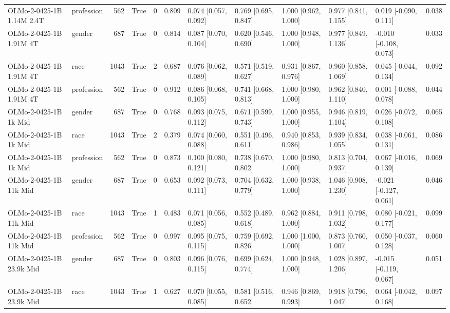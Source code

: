 \begin{tabular}{llrrrrlllllr}
OLMo-2-0425-1B 1.14M 2.4T & profession & 562 & True & 0 & 0.809 & 0.074 [0.057, 0.092] & 0.769 [0.695, 0.847] & 1.000 [0.962, 1.000] & 0.977 [0.841, 1.155] & 0.019 [-0.090, 0.111] & 0.038 \\
OLMo-2-0425-1B 1.91M 4T & gender & 687 & True & 0 & 0.814 & 0.087 [0.070, 0.104] & 0.620 [0.546, 0.690] & 1.000 [0.948, 1.000] & 0.977 [0.849, 1.136] & -0.010 [-0.108, 0.073] & 0.033 \\
OLMo-2-0425-1B 1.91M 4T & race & 1043 & True & 2 & 0.687 & 0.076 [0.062, 0.089] & 0.571 [0.519, 0.627] & 0.931 [0.867, 0.976] & 0.960 [0.858, 1.069] & 0.045 [-0.044, 0.134] & 0.092 \\
OLMo-2-0425-1B 1.91M 4T & profession & 562 & True & 0 & 0.912 & 0.086 [0.068, 0.105] & 0.741 [0.668, 0.813] & 1.000 [0.980, 1.000] & 0.962 [0.840, 1.110] & 0.001 [-0.088, 0.078] & 0.044 \\
OLMo-2-0425-1B 1k Mid & gender & 687 & True & 0 & 0.768 & 0.093 [0.075, 0.112] & 0.671 [0.599, 0.743] & 1.000 [0.955, 1.000] & 0.946 [0.819, 1.104] & 0.026 [-0.072, 0.108] & 0.065 \\
OLMo-2-0425-1B 1k Mid & race & 1043 & True & 2 & 0.379 & 0.074 [0.060, 0.088] & 0.551 [0.496, 0.611] & 0.940 [0.853, 0.986] & 0.939 [0.834, 1.055] & 0.038 [-0.061, 0.131] & 0.086 \\
OLMo-2-0425-1B 1k Mid & profession & 562 & True & 0 & 0.873 & 0.100 [0.080, 0.121] & 0.738 [0.670, 0.802] & 1.000 [0.980, 1.000] & 0.813 [0.704, 0.937] & 0.067 [-0.016, 0.139] & 0.069 \\
OLMo-2-0425-1B 11k Mid & gender & 687 & True & 0 & 0.653 & 0.092 [0.073, 0.111] & 0.704 [0.632, 0.779] & 1.000 [0.938, 1.000] & 1.046 [0.908, 1.230] & -0.021 [-0.127, 0.061] & 0.046 \\
OLMo-2-0425-1B 11k Mid & race & 1043 & True & 1 & 0.483 & 0.071 [0.056, 0.085] & 0.552 [0.489, 0.618] & 0.962 [0.884, 1.000] & 0.911 [0.798, 1.032] & 0.080 [-0.021, 0.177] & 0.099 \\
OLMo-2-0425-1B 11k Mid & profession & 562 & True & 0 & 0.997 & 0.095 [0.075, 0.115] & 0.759 [0.692, 0.826] & 1.000 [1.000, 1.000] & 0.873 [0.760, 1.007] & 0.050 [-0.037, 0.128] & 0.060 \\
OLMo-2-0425-1B 23.9k Mid & gender & 687 & True & 0 & 0.803 & 0.096 [0.076, 0.115] & 0.699 [0.624, 0.774] & 1.000 [0.948, 1.000] & 1.028 [0.897, 1.206] & -0.015 [-0.119, 0.067] & 0.051 \\
OLMo-2-0425-1B 23.9k Mid & race & 1043 & True & 1 & 0.627 & 0.070 [0.055, 0.085] & 0.581 [0.516, 0.652] & 0.946 [0.869, 0.993] & 0.918 [0.796, 1.047] & 0.064 [-0.042, 0.168] & 0.097 \\

\end{tabular}
